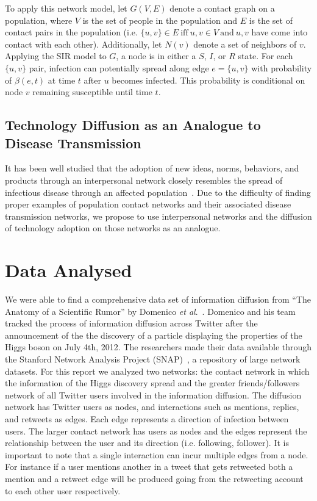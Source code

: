 \documentclass[12pt, oneside, openany]{article} %
\begin{document}
To apply this network model, let $G(V, E)$ denote a contact graph on a population, where $V$ is the set of people in the population and $E$ is the set of contact pairs in the population (i.e. $\{u,v\}\in E~ \mathrm{iff}~u,v\in V~\mathrm{and}~u,v$ have come into contact with each other). Additionally, let $N(v)$ denote a set of neighbors of $v$. Applying the SIR model to $G$, a node is in either a $S$, $I$, or $R$ state. For each $\{u,v\}$ pair, infection can potentially spread along edge $e = \{u, v\}$ with probability of $ \beta(e,t) $ at time $t$ after $u$ becomes infected. This probability is conditional on node $v$ remaining susceptible until time $t$.~\cite{marathe} 

\subsection{Technology Diffusion as an Analogue to Disease Transmission}
It has been well studied that the adoption of new ideas, norms, behaviors, and products through an interpersonal network closely resembles the spread of infectious disease through an affected population~\cite{goel}. Due to the difficulty of finding proper examples of population contact networks and their associated disease transmission networks, we propose to use interpersonal networks and the diffusion of technology adoption on those networks as an analogue.

\section{Data Analysed}
We were able to find a comprehensive data set of information diffusion from ``The Anatomy of a Scientific Rumor'' by Domenico \emph{et al}.~\cite{domenico}. Domenico and his team tracked the process of information diffusion across Twitter after the announcement of the the discovery of a particle displaying the properties of the Higgs boson on July 4th, 2012. The researchers made their data available through the Stanford Network Analysis Project (SNAP)~\cite{snap}, a repository of large network datasets. For this report we analyzed two networks: the contact network in which the information of the Higgs discovery spread and the greater friends/followers network of all Twitter users involved in the information diffusion. The diffusion network has Twitter users as nodes, and interactions such as mentions, replies, and retweets as edges. Each edge represents a direction of infection between users. The larger contact network has users as nodes and the edges represent the relationship between the user and its direction (i.e. following, follower). It is important to note that a single interaction can incur multiple edges from a node. For instance if a user mentions another in a tweet that gets retweeted both a mention and a retweet edge will be produced going from the retweeting account to each other user respectively.
\end{document}
